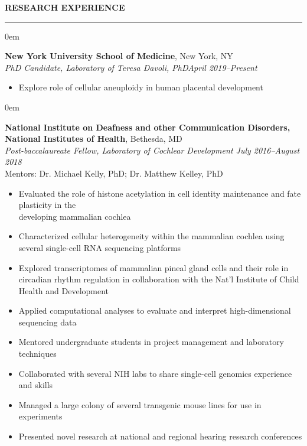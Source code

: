 \documentclass[11pt, letterpaper]{article}
\newenvironment{CVSection}{
\begin{addmargin}[2em]{0em}
\begin{samepage}}
{\end{samepage}
\end{addmargin}\bigskip}
\newcommand{\CVHeading}[1]{
\MakeUppercase{\bf #1}
\smallskip
\hrule
\medskip
}
\begin{document}
\CVHeading{Research Experience}
\begin{CVSection}
\textbf{New York University School of Medicine}, New York, NY\\
\textsl{PhD Candidate, Laboratory of Teresa Davoli, PhD\hfill April 2019--Present}
\begin{itemize}
    \item Explore role of cellular aneuploidy in human placental development
\end{itemize}
\end{CVSection}
\begin{CVSection}
\textbf{National Institute on Deafness and other Communication Disorders,\\National Institutes of Health}, Bethesda, MD\\
\textsl{Post-baccalaureate Fellow, Laboratory of Cochlear Development	\hfill July 2016--August 2018\\}
Mentors: Dr. Michael Kelly, PhD; Dr. Matthew Kelley, PhD
\begin{itemize}
\item Evaluated the role of histone acetylation in cell identity maintenance and fate plasticity in the\\ developing mammalian cochlea
\item Characterized cellular heterogeneity within the mammalian cochlea using several single-cell RNA sequencing platforms
\item Explored transcriptomes of mammalian pineal gland cells and their role in circadian rhythm regulation in collaboration with the Nat'l Institute of Child Health and Development
\item Applied computational analyses to evaluate and interpret high-dimensional sequencing data
\item Mentored undergraduate students in project management and laboratory techniques
\item Collaborated with several NIH labs to share single-cell genomics experience and skills
\item Managed a large colony of several transgenic mouse lines for use in experiments
\item Presented novel research at national and regional hearing research conferences
\end{itemize}
\end{CVSection}
\end{document}

